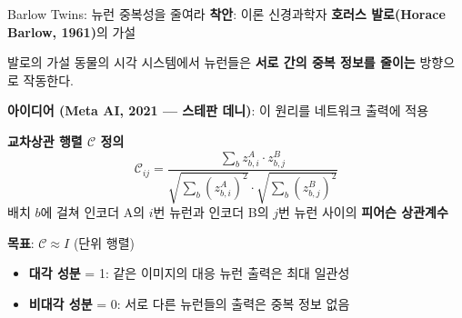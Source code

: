 \documentclass[aspectratio=169,10pt]{beamer}
\begin{document}
\begin{frame}{Barlow Twins: 뉴런 중복성을 줄여라}
\textbf{착안}: 이론 신경과학자 \textbf{호러스 발로(Horace Barlow, 1961)}의 가설

\vspace{0.2em}
\begin{block}{발로의 가설}
동물의 시각 시스템에서 뉴런들은 \textbf{서로 간의 중복 정보를 줄이는} 방향으로 작동한다.
\end{block}

\vspace{0.4em}
\textbf{아이디어 (Meta AI, 2021 --- 스테판 데니)}: 이 원리를 네트워크 출력에 적용

\vspace{0.3em}
\textbf{교차상관 행렬 $\mathcal{C}$ 정의}
\[
\mathcal{C}_{ij} = \frac{\sum_b z^A_{b,i} \cdot z^B_{b,j}}{\sqrt{\sum_b (z^A_{b,i})^2} \cdot \sqrt{\sum_b (z^B_{b,j})^2}}
\]
배치 $b$에 걸쳐 인코더 A의 $i$번 뉴런과 인코더 B의 $j$번 뉴런 사이의 \textbf{피어슨 상관계수}

\vspace{0.3em}
\textbf{목표}: $\mathcal{C} \approx I$ (단위 행렬)
\begin{itemize}
  \item \textbf{대각 성분} = 1: 같은 이미지의 대응 뉴런 출력은 최대 일관성
  \item \textbf{비대각 성분} = 0: 서로 다른 뉴런들의 출력은 \alert{중복 정보 없음}
\end{itemize}
\end{frame}
\end{document}
